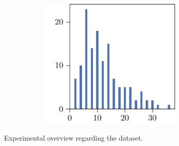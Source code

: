 \begin{figure}[p]
\begin{subfigure}{\textwidth}
\begin{subfigure}{\mymultiouter}
    \end{subfigure}
    \begin{subfigure}{\mymultiouter}
        \centering
          \includegraphics[width=\mymultiinner]{figures/new/manhattan-wine-permutation-retraining}
      \end{subfigure}
  \end{subfigure}
    \caption{Experimental overview regarding the \wine{} dataset.}
\end{figure}



